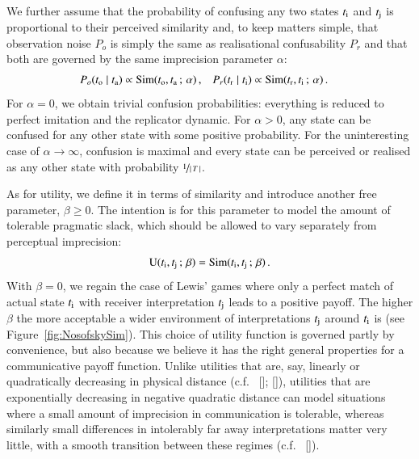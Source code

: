 \documentclass[12pt,english]{article}
\newcommand{\imprecision}{\ensuremath{\alpha}} %
\newcommand{\toler}{\ensuremath{\beta}} %
\newcommand{\similarity}{\ensuremath{\mathrm{Sim}}} %
\numberwithin{equation}{section}
\newcommand{\citealtbjps}[1]{\citeauthor{#1} [\citeyear{#1}]}
\newcommand{\citepbjpspre}[2]{(#1~\citeauthor{#2} [\citeyear{#2}])}
\begin{document}
We further assume that the probability of confusing any two states $t_{\mathrm{i}}$ and
$t_{\mathrm{j}}$ is proportional to their perceived similarity and, to keep matters simple, that
observation noise $P_o$ is simply the same as realisational confusability $P_r$ and
that both are governed by the same imprecision parameter $\alpha$:
\begin{align*}
  P_o(\mystate{o} \probbar \mystate{a}) & \propto \similarity(\mystate{o}, \mystate{a} \myts ; \myts
  \imprecision)\,, &   P_r(\mystate{r} \probbar \mystate{i}) & \propto \similarity(\mystate{r}, \mystate{i} \myts ; \myts
  \imprecision) \,.
\end{align*}
For $\imprecision = 0$, we obtain trivial confusion probabilities: everything is reduced to
perfect imitation and the replicator dynamic. For $\imprecision > 0$, any state can be confused
for any other state with some positive probability. For the uninteresting case of
$\imprecision \rightarrow \infty$, confusion is maximal and every state can be perceived or
realised as any other state with probability $\nicefrac{1}{\left \lvert \, T \, \right\rvert}$.

As for utility, we define it in terms of similarity and introduce another free parameter,
$\toler \ge 0$.  The intention is for this parameter to model the amount of tolerable pragmatic
slack, which should be allowed to vary separately from perceptual imprecision:
\begin{align*}
  \util(\mystate{i}, \mystate{j} \myts ; \myts \toler) =
      \similarity(\mystate{i}, \mystate{j} \myts ; \myts \toler)\,.
\end{align*}
With $\toler = 0$, we regain the case of Lewis' games where only a perfect match of actual
state $t_{\mathrm{i}}$ with receiver interpretation $t_{\mathrm{j}}$ leads to a positive payoff. The
higher $\toler$ the more acceptable a wider environment of interpretations $t_{\mathrm{j}}$ around
$t_{\mathrm{i}}$ is (see Figure~\ref{fig:NosofskySim}).  This choice of utility function is
governed partly by convenience, but also because we believe it has the right general properties
for a communicative payoff function.  Unlike utilities that are, say, linearly or quadratically
decreasing in physical distance (c.f.~\citealtbjps{JagerMetzger2011:Voronoi-Languag};
\citealtbjps{FrankeJager2010:Vagueness-Signa}), utilities that are exponentially decreasing in
negative quadratic distance can model situations where a small amount of imprecision in
communication is tolerable, whereas similarly small differences in intolerably far away
interpretations matter very little, with a smooth transition between these regimes
\citepbjpspre{c.f.}{OConnor2013:The-Evolution-o}.
\end{document}
